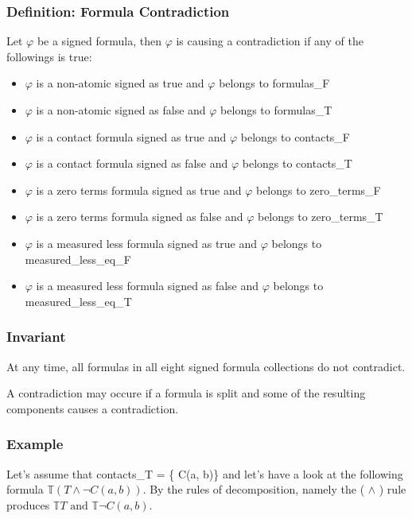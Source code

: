 \documentclass{article}
\begin{document}
		\subsubsection*{Definition: Formula Contradiction}
          	 		Let $\varphi$ be a signed formula, then $\varphi$ is causing a contradiction if any of the followings is true:
	  		\begin{itemize}
                		\item $\varphi$ is a non-atomic signed as true and $\varphi$ belongs to formulas\_F
			\item $\varphi$ is a non-atomic signed as false and $\varphi$ belongs to formulas\_T
                		\item $\varphi$ is a contact formula signed as true and $\varphi$ belongs to contacts\_F
               		\item $\varphi$ is a contact formula signed as false and $\varphi$ belongs to contacts\_T
                		\item $\varphi$ is a zero terms formula signed as true and $\varphi$ belongs to zero\_terms\_F
                		\item $\varphi$ is a zero terms formula signed as false and $\varphi$ belongs to zero\_terms\_T
                		\item $\varphi$ is a measured less formula signed as true and $\varphi$ belongs to measured\_less\_eq\_F
                		\item $\varphi$ is a measured less formula signed as false and $\varphi$ belongs to measured\_less\_eq\_T
            	\end{itemize}

		\subsubsection*{Invariant}
			At any time, all formulas in all eight signed formula collections do not contradict.

			A contradiction may occure if a formula is split and some of the resulting components causes a contradiction.

		\subsubsection*{Example}
			Let's assume that contacts\_T = \{ C(a, b)\} and let's have a look at the following formula $\mathbb{T}(T \wedge \neg C(a,b))$.
			\newline
			By the rules of decomposition, namely the ( $\wedge$ ) rule produces $\mathbb{T}T \text{ and } \mathbb{T}\neg C(a,b)$. 
\end{document}
